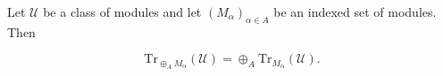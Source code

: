 Let $\mathcal{U}$ be a class of modules and let $(M_\alpha)_{\alpha \in A}$ be an indexed set of modules. Then

$$\mathrm{Tr}_{\oplus_A M_\alpha}(\mathcal{U}) = \oplus_A \mathrm{Tr}_{M_\alpha}(\mathcal{U}).$$
